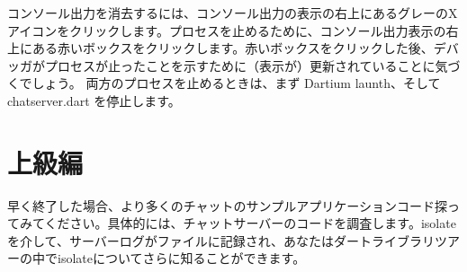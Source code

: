 
コンソール出力を消去するには、コンソール出力の表示の右上にあるグレーのXアイコンをクリックします。プロセスを止めるために、コンソール出力表示の右上にある赤いボックスをクリックします。赤いボックスをクリックした後、デバッガがプロセスが止ったことを示すために（表示が）更新されていることに気づくでしょう。
両方のプロセスを止めるときは、まず Dartium launth、そして chatserver.dart を停止します。


\section{上級編}

早く終了した場合、より多くのチャットのサンプルアプリケーションコード探ってみてください。具体的には、チャットサーバーのコードを調査します。isolateを介して、サーバーログがファイルに記録され、あなたはダートライブラリツアーの中でisolateについてさらに知ることができます。

\clearpage

